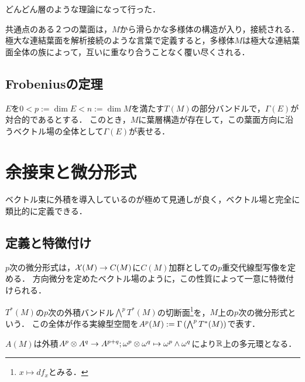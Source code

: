 \documentclass[uplatex,dvipdfmx]{jsreport}
\begin{document}
\begin{tcolorbox}[colframe=ForestGreen, colback=ForestGreen!10!white,breakable,colbacktitle=ForestGreen!40!white,coltitle=black,fonttitle=\bfseries\sffamily,
title=]
    どんどん層のような理論になって行った．
\end{tcolorbox}

共通点のある２つの葉面は，$M$から滑らかな多様体の構造が入り，接続される．
極大な連結葉面を解析接続のような言葉で定義すると，多様体$M$は極大な連結葉面全体の族によって，互いに重なり合うことなく覆い尽くされる．

\subsection{Frobeniusの定理}

\begin{theorem}
    $E$を$0<p:=\dim E<n:=\dim M$を満たす$T(M)$の部分バンドルで，$\Gamma(E)$が対合的であるとする．
    このとき，$M$に葉層構造が存在して，この葉面方向に沿うベクトル場の全体として$\Gamma(E)$が表せる．
\end{theorem}

\section{余接束と微分形式}

\begin{tcolorbox}[colframe=ForestGreen, colback=ForestGreen!10!white,breakable,colbacktitle=ForestGreen!40!white,coltitle=black,fonttitle=\bfseries\sffamily,
title=]
    ベクトル束に外積を導入しているのが極めて見通しが良く，ベクトル場と完全に類比的に定義できる．
\end{tcolorbox}

\subsection{定義と特徴付け}

\begin{tcolorbox}[colframe=ForestGreen, colback=ForestGreen!10!white,breakable,colbacktitle=ForestGreen!40!white,coltitle=black,fonttitle=\bfseries\sffamily,
title=]
    $p$次の微分形式は，$\mathcal{X}(M)\to C(M)$に$C(M)$加群としての$p$重交代線型写像を定める．
    方向微分を定めたベクトル場のように，この性質によって一意に特徴付けられる．
\end{tcolorbox}

\begin{definition}
    $T^*(M)$の$p$次の外積バンドル$\bigwedge^pT^*(M)$の切断面\footnote{$x\mapsto df_x$とみる．}を，$M$上の$p$次の微分形式という．
    この全体が作る実線型空間を$A^p(M):=\Gamma\left(\bigwedge^pT^*(M)\right)$で表す．
\end{definition}
\begin{remark}
    $A(M)$は外積$A^p\otimes A^q\to A^{p+q};\omega^p\otimes\omega^q\mapsto\omega^p\wedge\omega^q$により$\mathbb{R}$上の多元環となる．
\end{remark}
\end{document}
